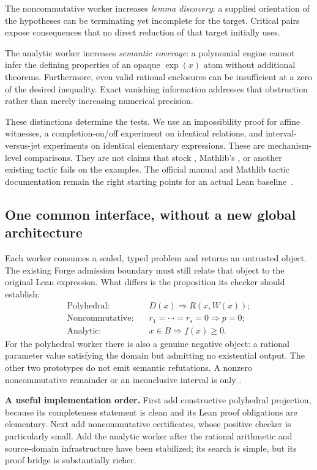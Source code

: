 The noncommutative worker increases \emph{lemma discovery}: a supplied orientation of the hypotheses can be terminating yet incomplete for the target. Critical pairs expose consequences that no direct reduction of that target initially uses.

The analytic worker increases \emph{semantic coverage}: a polynomial engine cannot infer the defining properties of an opaque \(\exp(x)\) atom without additional theorems. Furthermore, even valid rational enclosures can be insufficient at a zero of the desired inequality. Exact vanishing information addresses that obstruction rather than merely increasing numerical precision.

These distinctions determine the tests. We use an impossibility proof for affine witnesses, a completion-on/off experiment on identical relations, and interval-versus-jet experiments on identical elementary expressions. These are mechanism-level comparisons. They are not claims that stock \grind{}, Mathlib's , or another existing tactic fails on the examples. The official \grind{} manual and Mathlib tactic documentation remain the right starting points for an actual Lean baseline~\cite{grind-manual,noncomm-ring}.

\subsection{One common interface, without a new global architecture}
Each worker consumes a sealed, typed problem and returns an untrusted object. The existing Forge admission boundary must still relate that object to the original Lean expression. What differs is the proposition its checker should establish:
\begin{align*}
\text{Polyhedral:}\quad &D(x)\Longrightarrow R(x,W(x));\\
\text{Noncommutative:}\quad &r_1=\cdots=r_s=0\Longrightarrow p=0;\\
\text{Analytic:}\quad &x\in B\Longrightarrow f(x)\ge0.
\end{align*}
For the polyhedral worker there is also a genuine negative object: a rational parameter value satisfying the domain but admitting no existential output. The other two prototypes do not emit semantic refutations. A nonzero noncommutative remainder or an inconclusive interval is only \unknown{}.

\begin{focusbox}
\textbf{A useful implementation order.} First add constructive polyhedral projection, because its completeness statement is clean and its Lean proof obligations are elementary. Next add noncommutative certificates, whose positive checker is particularly small. Add the analytic worker after the rational arithmetic and source-domain infrastructure have been stabilized; its search is simple, but its proof bridge is substantially richer.
\end{focusbox}
